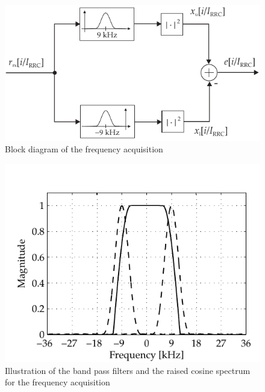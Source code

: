 \begin{figure}[htb]
	\centering
		\includegraphics{../kapitel04/figures/frequ_acq.pdf}
	\caption{Block diagram of the frequency acquisition}
	\label{fig:frequ_acq}
\end{figure}


\begin{figure}[!htb]
	\centering
		\includegraphics{../kapitel04/figures/freq_acq_design.pdf}
	\caption{Illustration of the band pass filters and the raised cosine spectrum for the frequency acquisition}
	\label{fig:freq_acq_design}
\end{figure}

